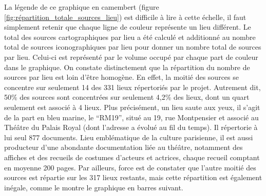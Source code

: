 La légende de ce graphique en camembert (figure \ref{fig:répartition_totale_sources_lieu}) est difficile à lire à cette échelle, il faut simplement retenir que chaque ligne de couleur représente un lieu différent. Le total des sources cartographiques par lieu a été calculé et additionné au nombre total de sources iconographiques par lieu pour donner un nombre total de sources par lieu. Celui-ci est représenté par le volume occupé par chaque part de couleur dans le graphique. On constate distinctement que la répartition du nombre de sources par lieu est loin d'être homogène. En effet, la moitié des sources se concentre sur seulement 14 des 331 lieux répertoriés par le projet. Autrement dit, 50\% des sources sont concentrées sur seulement 4,2\% des lieux, dont un quart seulement est associé à 4 lieux. Plus précisément, un lieu saute aux yeux, il s'agit de la part en bleu marine, le \enquote{RM19}, situé au 19, rue Montpensier et associé au Théâtre du Palais Royal (dont l'adresse a évolué au fil du temps). Il répertorie à lui seul 877 documents. Lieu emblématique de la culture parisienne, il est aussi producteur d'une abondante documentation liée au théâtre, notamment des affiches et des recueils de costumes d'acteurs et actrices, chaque recueil comptant en moyenne 200 pages. Par ailleurs, force est de constater que l'autre moitié des sources est répartie sur les 317 lieux restants, mais cette répartition est également inégale, comme le montre le graphique en barres suivant.

